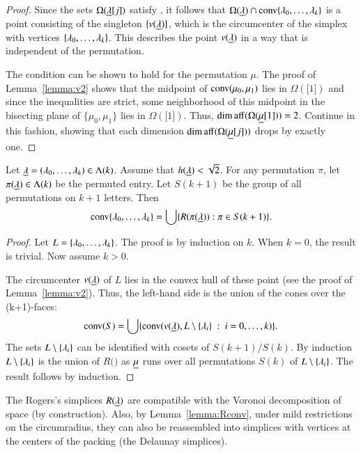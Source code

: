 \begin{proof} 
Since the sets $\Omega({\underline{\lambda}}[j])$ satisfy , it follows that
$\Omega({\underline{\lambda}})\cap {\operatorname{conv}}\{\lambda_0,\ldots,\lambda_k\}$ is a point consisting of the singleton $\{v({\underline{\lambda}})\}$, which is the
circumcenter of the simplex with vertices $\{\lambda_0,\ldots,\lambda_k\}$.  This describes
the point $v({\underline{\lambda}})$ in a way that is independent of the permutation.

The condition  can be shown to hold for the permutation $\mu$.
The proof of Lemma~\ref{lemma:v2} shows that the midpoint of ${\operatorname{conv}}(\mu_0,\mu_1)$
lies in $\Omega(\bm[1])$ and since the inequalities are strict, some neighborhood
of this midpoint in the bisecting plane of $\{\mu_0,\mu_1\}$ lies in $\Omega(\bm[1])$.
Thus, $\operatorname{dim\,aff}(\Omega({\underline{\mu}}[1]))=2$.  Continue in this fashion, showing that each dimension
$\operatorname{dim\,aff}(\Omega({\underline{\mu}}[j]))$ drops by exactly one.
\end{proof}

\begin{lemma}\label{lemma:Rconv} Let ${\underline{\lambda}} = (\lambda_0,\ldots,\lambda_k)\in\Lambda(k)$.  Assume that $h({\underline{\lambda}})<\sqrt2$.
For any permutation $\pi$, let $\pi({\underline{\lambda}})\in\Lambda(k)$ be the permuted entry.  Let
$S(k+1)$ be the group of all permutations on $k+1$ letters.   Then
$$
{\operatorname{conv}}\{\lambda_0,\ldots,\lambda_k\} = \bigcup \{ R(\pi({\underline{\lambda}})) : \pi\in S(k+1)\}.
$$
\end{lemma}

\begin{proof} Let $L = \{\lambda_0,\ldots,\lambda_k\}$.  The proof is by induction on $k$.
When $k=0$, the result is trivial.  Now assume $k>0$.

The circumcenter $v({\underline{\lambda}})$ of $L$ lies in the convex hull of these
point (see the proof of Lemma~\ref{lemma:v2}).  Thus, the left-hand side is the union
of the cones over the (k+1)-faces:
$$
{\operatorname{conv}}(S) = \bigcup\{ {\operatorname{conv}}(v({\underline{\lambda}}),L\setminus \{\lambda_i\}\ :\  i=0,\ldots,k) \}.
$$
The sets $L\setminus \{\lambda_i\}$ can be identified with  cosets of $S(k+1) /S(k)$.
By induction $L\setminus \{\lambda_i\}$ is the union of $R(\bm)$ as ${\underline{\mu}}$ runs
over all permutations $S(k)$ of $L\setminus \{\lambda_i\}$.
The result follows by induction.
\end{proof}

The Rogers's simplices $R({\underline{\lambda}})$ are compatible with the Voronoi
decomposition of space (by construction).  Also, by Lemma~\ref{lemma:Rconv}, under
mild restrictions on the circumradius, they can also be reassembled into simplices
with vertices at the centers of the packing (the Delaunay simplices).

